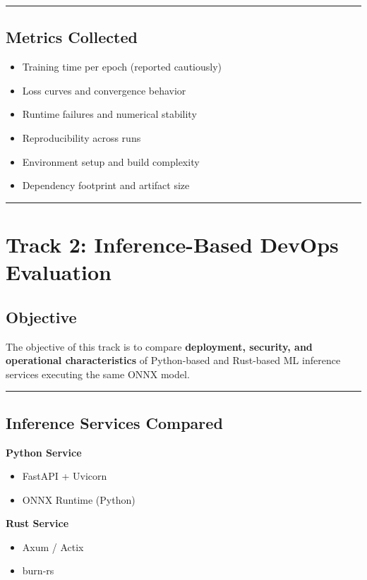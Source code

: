 \documentclass{ieeeaccess}
\begin{document}
\hrule

\subsection{Metrics Collected}

\begin{itemize}
    \item Training time per epoch (reported cautiously)
    \item Loss curves and convergence behavior
    \item Runtime failures and numerical stability
    \item Reproducibility across runs
    \item Environment setup and build complexity
    \item Dependency footprint and artifact size
\end{itemize}

\hrule

\section{Track 2: Inference-Based DevOps Evaluation}

\subsection{Objective}

The objective of this track is to compare \textbf{deployment, security, and operational characteristics} of Python-based and Rust-based ML inference services executing the same ONNX model.

\hrule

\subsection{Inference Services Compared}

\textbf{Python Service}
\begin{itemize}
    \item FastAPI + Uvicorn
    \item ONNX Runtime (Python)
\end{itemize}

\textbf{Rust Service}
\begin{itemize}
    \item Axum / Actix
    \item burn-rs
\end{itemize}
\end{document}
